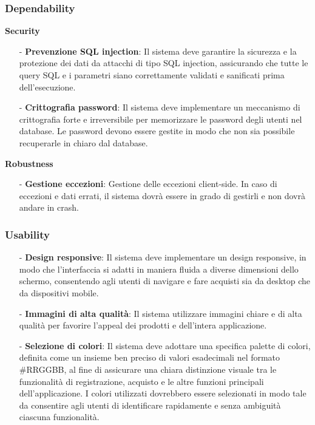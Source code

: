 \documentclass[12pt, a4paper, oneside]{book}
\begin{document}
        \subsubsection*{Dependability}
            \textbf{Security}
                \begin{itemize}
                    \item [-] \textbf{Prevenzione SQL injection}: Il sistema deve garantire la sicurezza e la protezione dei dati da attacchi di tipo SQL injection, assicurando che tutte le query SQL e i parametri siano correttamente validati e sanificati prima dell'esecuzione.
                    \item [-] \textbf{Crittografia password}: Il sistema deve implementare un meccanismo di crittografia forte e irreversibile per memorizzare le password degli utenti nel database. Le password devono essere gestite in modo che non sia possibile recuperarle in chiaro dal database.
                \end{itemize}
            \textbf{Robustness}
                \begin{itemize}
                    \item [-] \textbf{Gestione eccezioni}: Gestione delle eccezioni client-side. In caso di eccezioni e dati errati, il sistema dovrà essere in grado di gestirli e non dovrà andare in crash.
                \end{itemize}

        \subsubsection*{Usability}
            \begin{itemize}
                \item [-] \textbf{Design responsive}: Il sistema deve implementare un design responsive, in modo che l'interfaccia si adatti in maniera fluida a diverse dimensioni dello schermo, consentendo agli utenti di navigare e fare acquisti sia da desktop che da dispositivi mobile.
                \item [-] \textbf{Immagini di alta qualità}: Il sistema utilizzare immagini chiare e di alta qualità per favorire l'appeal dei prodotti e dell'intera applicazione.
                \item [-] \textbf{Selezione di colori}: Il sistema deve adottare una specifica palette di colori, definita come un insieme ben preciso di valori esadecimali nel formato \#RRGGBB, al fine di assicurare una chiara distinzione visuale tra le funzionalità di registrazione, acquisto e le altre funzioni principali dell'applicazione. I colori utilizzati dovrebbero essere selezionati in modo tale da consentire agli utenti di identificare rapidamente e senza ambiguità ciascuna funzionalità.
            \end{itemize}
\end{document}
